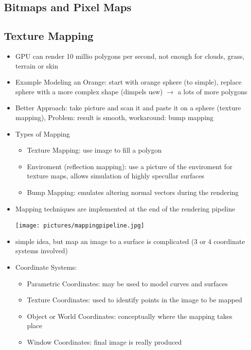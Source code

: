 \documentclass[11pt,a4paper]{article}
\begin{document}
	\subsection{Bitmaps and Pixel Maps}
	\subsection{Texture Mapping}
	\begin{itemize}
		\item GPU can render 10 millio polygons per second, not enough for clouds, grass, terrain or skin
		\item Example Modeling an Orange: start with orange sphere (to simple), replace sphere with a more complex shape (dimpels usw) $\rightarrow$ a lots of more polygons
		\item Better Approach: take picture and scan it and paste it on a sphere (texture mapping), Problem: result is smooth, workaround: bump mapping
		\item Types of Mapping
			\begin{itemize}
				\item Texture Mapping: use image to fill a polygon
				\item Enviroment (reflection mapping): use a picture of the enviroment for texture maps, allows simulation of highly specullar surfaces
				\item Bump Mapping: emulates altering normal vectors during the rendering
			\end{itemize}
		\item Mapping techniques are implemented at the end of the rendering pipeline
		\begin{center}
			\texttt{[image: pictures/mappingpipeline.jpg]}
		\end{center}
		\item simple idea, but map an image to a surface is complicated (3 or 4 coordinate systems involved)
		\item Coordinate Systems:
			\begin{itemize}
				\item Parametric Coordinates: may be used to model curves and surfaces
				\item Texture Coordinates: used to identify points in the image to be mapped
				\item Object or World Coordinates: conceptually where the mapping takes place
				\item Window Coordinates: final image is really produced
			\end{itemize}

\end{itemize}
\end{document}
